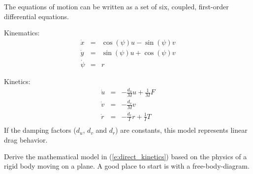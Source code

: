 The equations of motion can be written as  a set of six, coupled, first-order differential equations.

\noindent
Kinematics:
\begin{eqnarray}\label{e:direct_kinematics}
\dot{x} & = & \cos{(\psi)}u - \sin{(\psi)}v \\
\dot{y} & = & \sin{(\psi)}u + \cos{(\psi)}v \\
\dot{\psi} & = & r
\end{eqnarray}

\noindent
Kinetics:
\begin{eqnarray}\label{e:direct_kinetics}
\dot{u} & = & -\frac{d_u}{M}u + \frac{1}{M}F \\
\dot{v} & = & -\frac{d_v}{M}v \\
\dot{r} & = & -\frac{d_r}{I}r + \frac{1}{I}T \\
\end{eqnarray}
If the damping factors ($d_u$, $d_v$ and $d_r$) are constants, this model represents linear drag behavior.

\begin{ex}
Derive the mathematical model in (\ref{e:direct_kinetics}) based on the physics of a rigid body moving on a plane.  A good place to start is with a free-body-diagram.
\end{ex}

